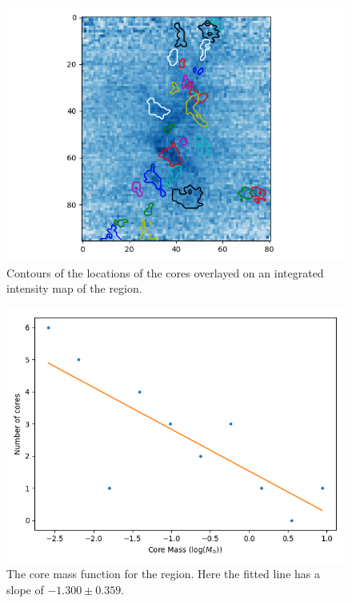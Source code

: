 \documentclass[11pt]{article}
\newenvironment{tight_enumerate}{
    \begin{enumerate}[label=(\alph*)]
    \setlength{\itemsep}{3pt}
    \setlength{\parskip}{0pt}}
    {\end{enumerate}}
\begin{document}
\begin{tight_enumerate}
\begin{figure}[H]
\centering
\includegraphics[height=0.45\textheight]{cores.png}
\vspace{-0.5em}
\caption{Contours of the locations of the cores overlayed on an integrated intensity map of the region.}
\vspace{-1em}
\end{figure}

\begin{figure}[H]
\centering
\includegraphics[height=0.45\textheight]{cmf.png}
\vspace{-0.5em}
\caption{The core mass function for the region. Here the fitted line has a slope of $-1.300\pm0.359$.}
\end{figure}
\end{tight_enumerate}
\end{document}

